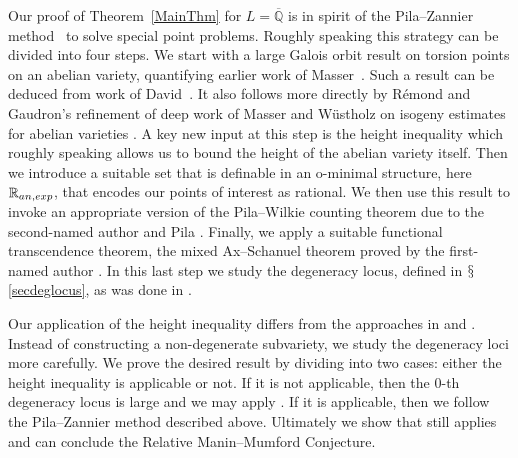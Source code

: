 \documentclass[12pt,oneside]{amsart}
\numberwithin{maincounter}{section}
\numberwithin{equation}{section}
\def\RR{\mathbb{R}}
\def\QQ{\mathbb{Q}}
\newcommand{\IRanexp}{{{\RR}_{\rm an,exp}}}
\newcommand{\IQbar}{{\overline{\QQ}}}
\begin{document}
Our proof of Theorem~\ref{MainThm} for  $L=\IQbar$ is in spirit of the Pila--Zannier
method~\cite{PilaZannier} to solve special point problems. Roughly
speaking this strategy can be divided into four steps. We start  
with a 
large Galois orbit result on 
torsion points on an abelian variety,
quantifying earlier work of Masser~\cite{Masser:smallvalues}. Such a
result can be deduced from work of David~\cite{DavidMinHaut}. It
also follows 
 more directly by R\'{e}mond and Gaudron's refinement
 \cite{RemondGaloisBound, GRGaloisBound}  of deep work of Masser and
 W\"{u}stholz
 on isogeny estimates for abelian varieties \cite{MW:abelianisog}. 
A key new input at this step is the 
height
inequality \cite[Theorem~B.1]{DGHUnifML} which roughly speaking allows
us to bound the height of the abelian variety itself.
Then we introduce a suitable set that is definable in an o-minimal
structure, here $\IRanexp$, that encodes our points of interest as rational.
We then use this result to invoke an
appropriate version of the Pila--Wilkie counting theorem
due to the second-named author and Pila \cite[Corollary~7.2]{HabeggerPilaENS}.
Finally, we apply a suitable functional transcendence theorem, the
mixed Ax--Schanuel theorem proved by the first-named author
\cite{GaoMixedAS}. In this last step we study the degeneracy locus,
defined in $\mathsection$\ref{secdeglocus}, as was done in
\cite[Proposition~1.10]{GaoBettiRank}.
 
Our application of the height
inequality \cite[Theorem~B.1]{DGHUnifML} differs  from the approaches in
\cite{DGHUnifML} and \cite{KuehneUnifMM}. Instead of constructing a
non-degenerate subvariety, we study the degeneracy loci more
carefully. We prove the desired result by dividing into two cases:
either the height inequality \cite[Theorem~B.1]{DGHUnifML} is
applicable or not. If it is not applicable, then the $0$-th degeneracy
locus is large and we may apply \cite[Proposition~1.10]{GaoBettiRank}.
If it is applicable, then we follow the Pila--Zannier method described
above. Ultimately we show that 
\cite[Proposition~1.10]{GaoBettiRank} still applies and can conclude
the Relative Manin--Mumford Conjecture.
\end{document}
